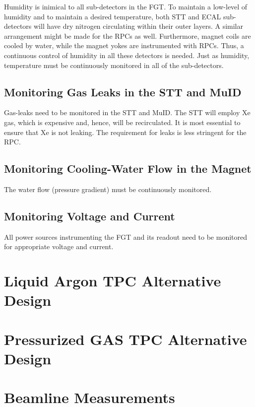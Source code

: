Humidity is inimical to all sub-detectors in the FGT. To maintain a low-level of 
humidity and to maintain a desired temperature, both STT and ECAL sub-detectors
will have dry nitrogen circulating within their outer layers. A similar arrangement 
might be made for the RPCs as well. Furthermore, magnet coils are cooled by water, 
while the magnet yokes are instrumented with RPCs. Thus, a continuous control of 
humidity in all these detectors is needed.
Just as humidity, temperature must be continuously monitored in all of the sub-detectors.

\subsection{Monitoring Gas Leaks in the STT and MuID}

Gas-leaks need to be monitored in the STT and MuID.
The STT will employ Xe gas, which is expensive and, hence, will be recirculated. It is 
most essential to ensure that Xe is not leaking. The requirement for leaks is less 
stringent for the RPC. 

\subsection{Monitoring Cooling-Water Flow in the Magnet}

The water flow (pressure gradient) must be continuously monitored.

\subsection{Monitoring Voltage and Current}

All power sources instrumenting the FGT and its readout need to be monitored for 
appropriate voltage and current.

\section{Liquid Argon TPC Alternative Design}
\label{sec:nd-nnd-lar-tpc-alt}

\section{Pressurized GAS TPC Alternative Design}
\label{sec:nd-nnd-gas-tpc-alt}

\section{Beamline Measurements}
\label{sec:nd-nnd-beamline-measurements}


